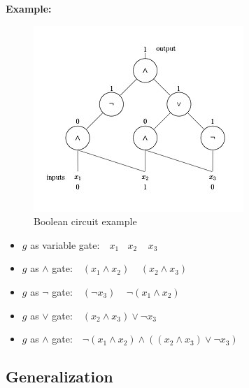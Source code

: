 \documentclass[a4]{scrartcl}
\begin{document}
\textbf{Example:} \\
\begin{minipage}{0.4\textwidth}

\begin{figure}[H]
\begin{center}
\includegraphics[scale=0.6]{booleanC.jpg}
\end{center}
\caption{Boolean circuit example \cite{booleanC}}
\end{figure}

\end{minipage}\begin{minipage}{0.6\textwidth}

\begin{itemize}
\item $g$ as variable gate: $\ \ \ x_1 \ \ \ \  x_2 \ \ \ \ \ x_3$
\item $g$ as $\wedge$ gate: $\ \ \ (x_1 \wedge x_2) \ \ \ \ \ (x_2 \wedge x_3)$
\item $g$ as $\lnot$ gate: $\ \ \ (\lnot x_3) \ \ \ \ \ \lnot (x_1 \wedge x_2)$
\item $g$ as $\vee$ gate: $\ \ \ (x_2 \wedge x_3) \vee \lnot x_3$
\item $g$ as $\wedge$ gate: $\ \ \ \lnot(x_1 \wedge x_2) \wedge ((x_2 \wedge x_3) \vee \lnot x_3)$
\end{itemize}

\end{minipage}













\subsection*{Generalization}
\end{document}
